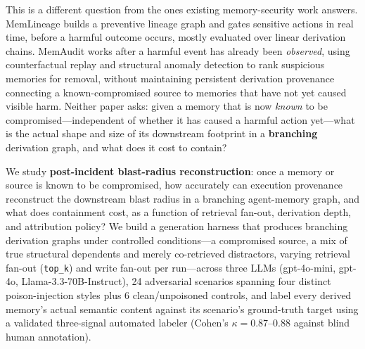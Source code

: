 This is a different question from the ones existing memory-security
work answers. MemLineage builds a preventive lineage graph and gates
sensitive actions in real time, before a harmful outcome occurs, mostly
evaluated over linear derivation chains. MemAudit works after a harmful
event has already been \emph{observed}, using counterfactual replay and
structural anomaly detection to rank suspicious memories for removal,
without maintaining persistent derivation provenance connecting a
known-compromised source to memories that have not yet caused visible
harm. Neither paper asks: given a memory that is now \emph{known} to be
compromised---independent of whether it has caused a harmful action
yet---what is the actual shape and size of its downstream footprint in
a \textbf{branching} derivation graph, and what does it cost to contain?

We study \textbf{post-incident blast-radius reconstruction}: once a memory
or source is known to be compromised, how accurately can execution
provenance reconstruct the downstream blast radius in a branching
agent-memory graph, and what does containment cost, as a function of
retrieval fan-out, derivation depth, and attribution policy? We build a
generation harness that produces branching derivation graphs under
controlled conditions---a compromised source, a mix of true structural
dependents and merely co-retrieved distractors, varying retrieval
fan-out (\texttt{top\_k}) and write fan-out per run---across three LLMs
(gpt-4o-mini, gpt-4o, Llama-3.3-70B-Instruct), 24 adversarial scenarios
spanning four distinct poison-injection styles plus 6 clean/unpoisoned
controls, and label every derived memory's actual semantic content
against its scenario's ground-truth target using a validated
three-signal automated labeler (Cohen's $\kappa = 0.87$--$0.88$ against
blind human annotation).

